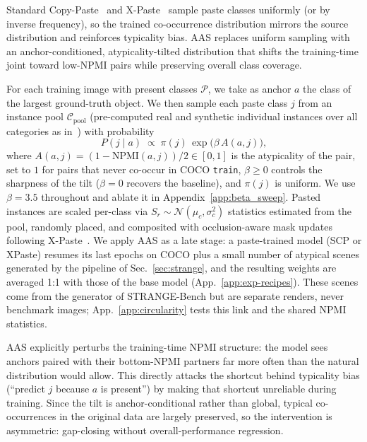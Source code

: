 Standard Copy-Paste~\cite{ghiasi2021simple} and X-Paste~\cite{zhao2023x} sample paste classes uniformly (or by inverse frequency), so the trained co-occurrence distribution mirrors the source distribution and reinforces typicality bias. AAS replaces uniform sampling with an anchor-conditioned, atypicality-tilted distribution that shifts the training-time joint toward low-NPMI pairs while preserving overall class coverage.

For each training image with present classes $\mathcal{P}$, we take as anchor $a$ the class of the largest ground-truth object. We then sample each paste class $j$ from an instance pool $\mathcal{C}_{\text{pool}}$ (pre-computed real and synthetic individual instances over all categories as in~\cite{zhao2023x}) with probability
\begin{equation}
P(j \mid a) \;\propto\; \pi(j) \, \exp\big(\beta \, A(a, j)\big),
\end{equation}
 where $A(a, j) = (1 - \text{NPMI}(a, j))/2 \in [0, 1]$ is the atypicality of the pair, set to $1$ for pairs that never co-occur in COCO \texttt{train}, $\beta \geq 0$ controls the sharpness of the tilt ($\beta = 0$ recovers the baseline), and $\pi(j)$ is uniform. We use $\beta = 3.5$ throughout and ablate it in Appendix~\ref{app:beta_sweep}. Pasted instances are scaled per-class via $S_r \sim \mathcal{N}(\mu_c, \sigma_c^2)$ statistics estimated from the pool, randomly placed, and composited with occlusion-aware mask updates following X-Paste~\cite{zhao2023x}.
We apply AAS as a late stage: a paste-trained model (SCP or XPaste) resumes its last epochs on COCO plus a small number of atypical scenes generated by the pipeline of Sec.~\ref{sec:strange}, and the resulting weights are averaged 1:1 with those of the base model (App.~\ref{app:exp-recipes}). These scenes come from the generator of STRANGE-Bench but are separate renders, never benchmark images; App.~\ref{app:circularity} tests this link and the shared NPMI statistics.

 AAS explicitly perturbs the training-time NPMI structure: the model sees anchors paired with their bottom-NPMI partners far more often than the natural distribution would allow. This directly attacks the shortcut behind typicality bias (``predict $j$ because $a$ is present'') by making that shortcut unreliable during training. Since the tilt is anchor-conditional rather than global, typical co-occurrences in the original data are largely preserved, so the intervention is asymmetric: gap-closing without overall-performance regression.
